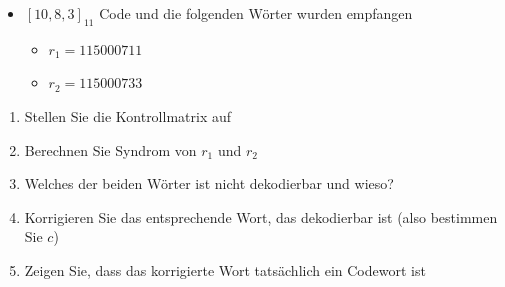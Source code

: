 \begin{aufgabe}
\begin{itemize}
  \item $[10, 8, 3]_{11}$ Code und die folgenden Wörter wurden empfangen
  \begin{itemize}
    \item $r_1 = 115000711$
    \item $r_2 = 115000733$
  \end{itemize}
\end{itemize}
\begin{enumerate}
  \item[a)] Stellen Sie die Kontrollmatrix auf
  \item[b)] Berechnen Sie Syndrom von $r_1$ und $r_2$
  \item[c)] Welches der beiden Wörter ist nicht dekodierbar und wieso?
  \item[d)] Korrigieren Sie das entsprechende Wort, das dekodierbar ist (also bestimmen Sie $c$)
  \item[e)] Zeigen Sie, dass das korrigierte Wort tatsächlich ein Codewort ist
\end{enumerate}
\end{aufgabe}
